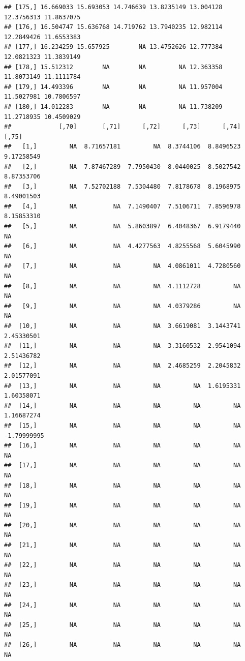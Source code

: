 \documentclass{article}\usepackage[]{graphicx}\usepackage[]{color}
\makeatletter
\newenvironment{kframe}{%
 \def\at@end@of@kframe{}%
 \ifinner\ifhmode%
  \def\at@end@of@kframe{\end{minipage}}%
  \begin{minipage}{\columnwidth}%
 \fi\fi%
 \def\FrameCommand##1{\hskip\@totalleftmargin \hskip-\fboxsep
 \colorbox{shadecolor}{##1}\hskip-\fboxsep
     \hskip-\linewidth \hskip-\@totalleftmargin \hskip\columnwidth}%
 \MakeFramed {\advance\hsize-\width
   \@totalleftmargin\z@ \linewidth\hsize
   \@setminipage}}%
 {\par\unskip\endMakeFramed%
 \at@end@of@kframe}
\newenvironment{knitrout}{}{} %
\makeatother
\begin{document}
\begin{knitrout}
\begin{kframe}
\begin{verbatim}
## [175,] 16.669033 15.693053 14.746639 13.8235149 13.004128 12.3756313 11.8637075
## [176,] 16.504747 15.636768 14.719762 13.7940235 12.982114 12.2849426 11.6553383
## [177,] 16.234259 15.657925        NA 13.4752626 12.777384 12.0821323 11.3839149
## [178,] 15.512312        NA        NA         NA 12.363358 11.8073149 11.1111784
## [179,] 14.493396        NA        NA         NA 11.957004 11.5027981 10.7806597
## [180,] 14.012283        NA        NA         NA 11.738209 11.2718935 10.4509029
##             [,70]       [,71]      [,72]      [,73]      [,74]       [,75]
##   [1,]         NA  8.71657181         NA  8.3744106  8.8496523  9.17258549
##   [2,]         NA  7.87467289  7.7950430  8.0440025  8.5027542  8.87353706
##   [3,]         NA  7.52702188  7.5304480  7.8178678  8.1968975  8.49001503
##   [4,]         NA          NA  7.1490407  7.5106711  7.8596978  8.15853310
##   [5,]         NA          NA  5.8603897  6.4048367  6.9179440          NA
##   [6,]         NA          NA  4.4277563  4.8255568  5.6045990          NA
##   [7,]         NA          NA         NA  4.0861011  4.7280560          NA
##   [8,]         NA          NA         NA  4.1112728         NA          NA
##   [9,]         NA          NA         NA  4.0379286         NA          NA
##  [10,]         NA          NA         NA  3.6619081  3.1443741  2.45330501
##  [11,]         NA          NA         NA  3.3160532  2.9541094  2.51436782
##  [12,]         NA          NA         NA  2.4685259  2.2045832  2.01577091
##  [13,]         NA          NA         NA         NA  1.6195331  1.60358071
##  [14,]         NA          NA         NA         NA         NA  1.16687274
##  [15,]         NA          NA         NA         NA         NA -1.79999995
##  [16,]         NA          NA         NA         NA         NA          NA
##  [17,]         NA          NA         NA         NA         NA          NA
##  [18,]         NA          NA         NA         NA         NA          NA
##  [19,]         NA          NA         NA         NA         NA          NA
##  [20,]         NA          NA         NA         NA         NA          NA
##  [21,]         NA          NA         NA         NA         NA          NA
##  [22,]         NA          NA         NA         NA         NA          NA
##  [23,]         NA          NA         NA         NA         NA          NA
##  [24,]         NA          NA         NA         NA         NA          NA
##  [25,]         NA          NA         NA         NA         NA          NA
##  [26,]         NA          NA         NA         NA         NA          NA

\end{verbatim}
\end{kframe}
\end{knitrout}
\end{document}
